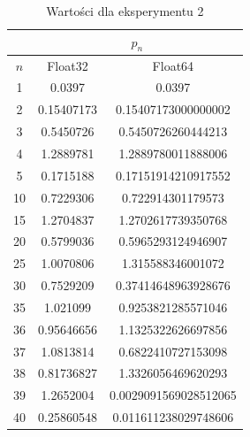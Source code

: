 \documentclass[12pt]{article}
\begin{document}
\begin{table}[!hbt]
\centering
\footnotesize
    \label{tab:table7}
    \begin{tabular}{|c|c|c|}
    		\hline
    		 & \multicolumn{2}{c|}{$p_n$} \\
    		 \hline
    		 $n$ & Float32 & Float64\\
    		\hline
    		\hline
1 & 0.0397 & 0.0397\\
\hline
2 & 0.15407173 & 0.15407173000000002\\
\hline
3 & 0.5450726 & 0.5450726260444213\\
\hline
4 & 1.2889781 & 1.2889780011888006\\
\hline
5 & 0.1715188 & 0.17151914210917552\\
\hline
\hline
10 & 0.7229306 & 0.722914301179573\\
\hline
15 & 1.2704837 & 1.2702617739350768\\
\hline
20 & 0.5799036 & 0.5965293124946907\\
\hline
25 & 1.0070806 & 1.315588346001072\\
\hline
30 & 0.7529209 & 0.37414648963928676\\
\hline
\hline
35 & 1.021099 & 0.9253821285571046\\
\hline
36 & 0.95646656 & 1.1325322626697856\\
\hline
37 & 1.0813814 & 0.6822410727153098\\
\hline
38 & 0.81736827 & 1.3326056469620293\\
\hline
39 & 1.2652004 & 0.0029091569028512065\\
\hline
40 & 0.25860548 & 0.011611238029748606\\
\hline
    \end{tabular}
    \caption{Wartości dla eksperymentu 2}
\end{table}
\end{document}
